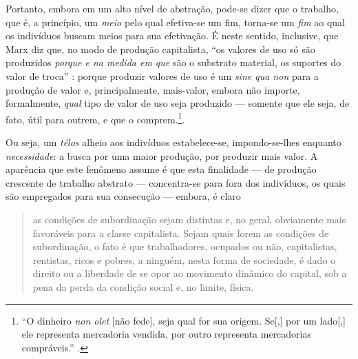 \documentclass[12pt]{article}
\numberwithin{equation}{section}
\theoremstyle{plain}
\theoremstyle{definition}
\theoremstyle{remark}
\begin{document}

Portanto, embora em um alto nível de abstração, pode-se dizer que o trabalho, que é, a princípio, um \textit{meio} pelo qual efetiva-se um fim, torna-se um \textit{fim} ao qual os indivíduos buscam meios para sua efetivação. É neste sentido, inclusive, que Marx diz que, no modo de produção capitalista, ``os valores de uso só são produzidos \textit{porque e na medida em que} são o substrato material, os suportes do valor de troca'' \parencite[p. 263, grifo meu]{Marx2017}: porque produzir valores de uso é um \textit{sine qua non} para a produção de valor e, principalmente, mais-valor, embora não importe, formalmente, \textit{qual} tipo de valor de uso seja produzido --- somente que ele seja, de fato, útil para outrem, e que o comprem.\footnote{``O dinheiro \textit{non olet} [não fede], seja qual for sua origem. Se[,] por um lado[,] ele representa mercadoria vendida, por outro representa mercadorias compráveis.'' \parencite[p. 184]{Marx2017}.}. 


Ou seja, um \textit{télos} alheio aos indivíduos estabelece-se, impondo-se-lhes enquanto \textit{necessidade}: a busca por uma maior produção, por produzir mais valor. A aparência que este fenômeno assume é que esta finalidade --- de produção crescente de trabalho abstrato --- concentra-se para fora dos indivíduos, os quais são empregados para sua consecução --- embora, é claro
\begin{quote}
    as condições de subordinação sejam distintas e, no geral, obviamente mais favoráveis para a classe capitalista. Sejam quais forem as condições de subordinação, o fato é que trabalhadores, ocupados ou não, capitalistas, rentistas, ricos e pobres, a ninguém, nesta forma de sociedade, é dado o direito ou a liberdade de se opor ao movimento dinâmico do capital, sob a pena da perda da condição social e, no limite, física. \parencite[p. 330]{Medeiros2013a}
\end{quote}
\end{document}
